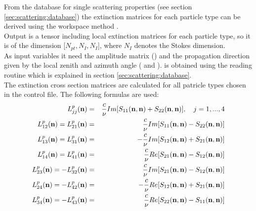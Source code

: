 \label{sec:scattering:ext_mat_gas}

\label{sec:scattering:ext_mat_spt}

From the database for single scattering properties (see section 
\ref{sec:scattering:database}) the extinction matrices for each
particle type can be derived using the workspace method
.\\
Output is a tensor including local extinction matrices for each
particle type, so it is of the dimension [$N_{pt}, N_{I}, N_{I}$],
where $N_{I}$ denotes the Stokes dimension.\\
As input variables it need the amplitude matrix ()
and the propagation direction given by the local zenith and azimuth
angle ( and ).  is
obtained using the reading routine  which is
explained in section \ref{sec:scattering:database}.\\

The extinction cross section matrices \SExMat{} are
calculated for all patricle types chosen in the control
file. The following formulas are used:
\begin{eqnarray}
  \label{eq:gen_ext_matrix}
  L^p_{jj}({\bf n}) &=& \frac{c}{\nu} Im[S_{11}({\bf n},{\bf
    n})+S_{22}({\bf n},{\bf n})], \quad j=1,...,4 \\
  L^p_{12}({\bf n}) = L^p_{21}({\bf n}) &=& \frac{c}{\nu} Im[S_{11}({\bf n},{\bf
    n})-S_{22}({\bf n},{\bf n})]\\
  L^p_{13}({\bf n}) = L^p_{31}({\bf n}) &=& -\frac{c}{\nu} Im[S_{12}({\bf n},{\bf
    n})+S_{21}({\bf n},{\bf n})]\\
  L^p_{14}({\bf n}) = L^p_{41}({\bf n}) &=& \frac{c}{\nu} Re[S_{21}({\bf n},{\bf
    n})-S_{12}({\bf n},{\bf n})]\\
  L^p_{23}({\bf n}) = -L^p_{32}({\bf n}) &=& \frac{c}{\nu} Im[S_{21}({\bf n},{\bf
    n})-S_{12}({\bf n},{\bf n})]\\
  L^p_{24}({\bf n}) = -L^p_{42}({\bf n}) &=& -\frac{c}{\nu} Re[S_{12}({\bf n},{\bf
    n})+S_{21}({\bf n},{\bf n})]\\
  L^p_{34}({\bf n}) = -L^p_{43}({\bf n}) &=& \frac{c}{\nu} Re[S_{22}({\bf n},{\bf
    n})-S_{11}({\bf n},{\bf n})]
\end{eqnarray}


